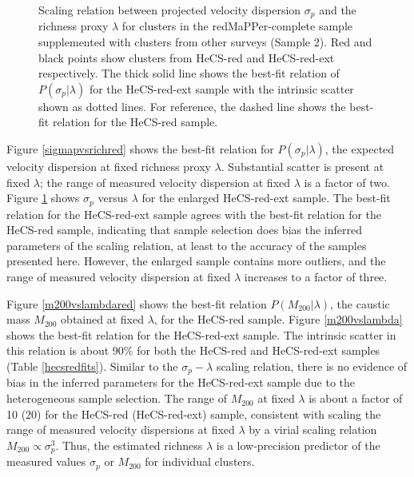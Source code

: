 \begin{figure} 
\caption{\label{sigmapvsrich} Scaling relation between projected velocity dispersion $\sigma_p$ and 
the richness proxy $\lambda$ for clusters in the redMaPPer-complete sample  
supplemented with clusters from other surveys (Sample 2). 
Red and black points show clusters from HeCS-red and HeCS-red-ext respectively.
The thick solid line shows the best-fit relation of 
$P(\sigma_p|\lambda)$ for the HeCS-red-ext  sample with the intrinsic scatter shown as dotted lines.  
For reference, the dashed line shows the best-fit relation for the HeCS-red sample.
}
\end{figure}



Figure \ref{sigmapvsrichred} shows the best-fit relation for $P(\sigma_p|\lambda)$, 
the expected velocity dispersion at fixed richness proxy $\lambda$.  
Substantial scatter is present at fixed $\lambda$; the range of measured velocity 
dispersion at fixed $\lambda$ is a factor of two.
Figure \ref{sigmapvsrich} shows $\sigma_p$ versus $\lambda$ for the enlarged 
HeCS-red-ext sample.  The best-fit relation for the HeCS-red-ext sample agrees with 
the best-fit relation for the HeCS-red sample, indicating that sample selection does 
bias the inferred parameters of the scaling relation, at least to the accuracy of the 
samples presented here.  However, the enlarged sample contains more outliers, 
and the range of measured velocity dispersion at fixed $\lambda$ increases to a 
factor of three. 


Figure \ref{m200vslambdared} shows the best-fit relation $P(M_{200}|\lambda)$, the 
caustic mass $M_{200}$ obtained at fixed $\lambda$, for the HeCS-red sample.  
Figure \ref{m200vslambda} shows the best-fit relation for the HeCS-red-ext sample.  The intrinsic  scatter in 
this relation is about 90\% for both the HeCS-red and HeCS-red-ext samples (Table \ref{hecsredfits}).
Similar to the $\sigma_p-\lambda$ scaling relation, there is no evidence of 
bias in the inferred parameters for the HeCS-red-ext sample due to the heterogeneous 
sample selection.
The range of $M_{200}$ at fixed $\lambda$ is about a factor of 10 (20) for 
the HeCS-red (HeCS-red-ext) sample, consistent with scaling the range of measured 
velocity dispersions at fixed $\lambda$ by a virial scaling relation 
$M_{200}\propto \sigma_p^3$.  Thus, the estimated richness $\lambda$ is a 
low-precision predictor of the measured values $\sigma_p$ or $M_{200}$
for individual clusters.


